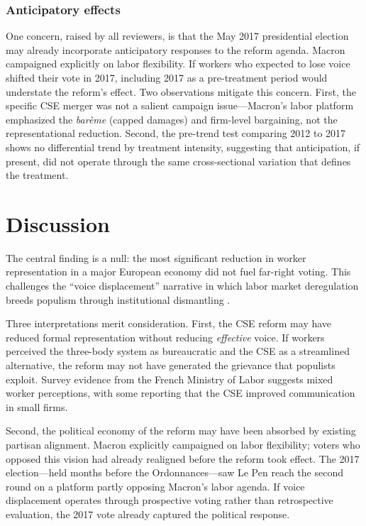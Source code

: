 \documentclass[12pt]{article}
\begin{document}
\subsubsection*{Anticipatory effects} One concern, raised by all reviewers, is that the May 2017 presidential election may already incorporate anticipatory responses to the reform agenda. Macron campaigned explicitly on labor flexibility. If workers who expected to lose voice shifted their vote in 2017, including 2017 as a pre-treatment period would understate the reform's effect. Two observations mitigate this concern. First, the specific CSE merger was not a salient campaign issue---Macron's labor platform emphasized the \textit{bar\`eme} (capped damages) and firm-level bargaining, not the representational reduction. Second, the pre-trend test comparing 2012 to 2017 shows no differential trend by treatment intensity, suggesting that anticipation, if present, did not operate through the same cross-sectional variation that defines the treatment.


\section{Discussion}

The central finding is a null: the most significant reduction in worker representation in a major European economy did not fuel far-right voting. This challenges the ``voice displacement'' narrative in which labor market deregulation breeds populism through institutional dismantling \citep{rodrik2018, guiso2019}.

Three interpretations merit consideration. First, the CSE reform may have reduced formal representation without reducing \textit{effective} voice. If workers perceived the three-body system as bureaucratic and the CSE as a streamlined alternative, the reform may not have generated the grievance that populists exploit. Survey evidence from the French Ministry of Labor suggests mixed worker perceptions, with some reporting that the CSE improved communication in small firms.

Second, the political economy of the reform may have been absorbed by existing partisan alignment. Macron explicitly campaigned on labor flexibility; voters who opposed this vision had already realigned before the reform took effect. The 2017 election---held months before the Ordonnances---saw Le Pen reach the second round on a platform partly opposing Macron's labor agenda. If voice displacement operates through prospective voting rather than retrospective evaluation, the 2017 vote already captured the political response.
\end{document}
